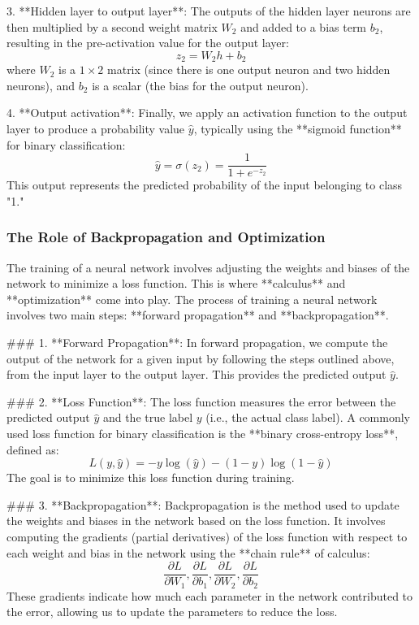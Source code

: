 \documentclass{article}
\begin{document}
3. **Hidden layer to output layer**: The outputs of the hidden layer neurons are then multiplied by a second weight matrix \( W_2 \) and added to a bias term \( b_2 \), resulting in the pre-activation value for the output layer:
   \[
   z_2 = W_2 h + b_2
   \]
   where \( W_2 \) is a \( 1 \times 2 \) matrix (since there is one output neuron and two hidden neurons), and \( b_2 \) is a scalar (the bias for the output neuron).

4. **Output activation**: Finally, we apply an activation function to the output layer to produce a probability value \( \hat{y} \), typically using the **sigmoid function** for binary classification:
   \[
   \hat{y} = \sigma(z_2) = \frac{1}{1 + e^{-z_2}}
   \]
   This output represents the predicted probability of the input belonging to class "1."

\subsubsection*{The Role of Backpropagation and Optimization}

The training of a neural network involves adjusting the weights and biases of the network to minimize a loss function. This is where **calculus** and **optimization** come into play. The process of training a neural network involves two main steps: **forward propagation** and **backpropagation**.

### 1. **Forward Propagation**:
   In forward propagation, we compute the output of the network for a given input by following the steps outlined above, from the input layer to the output layer. This provides the predicted output \( \hat{y} \).

### 2. **Loss Function**:
   The loss function measures the error between the predicted output \( \hat{y} \) and the true label \( y \) (i.e., the actual class label). A commonly used loss function for binary classification is the **binary cross-entropy loss**, defined as:
   \[
   L(y, \hat{y}) = -y \log(\hat{y}) - (1 - y) \log(1 - \hat{y})
   \]
   The goal is to minimize this loss function during training.

### 3. **Backpropagation**:
   Backpropagation is the method used to update the weights and biases in the network based on the loss function. It involves computing the gradients (partial derivatives) of the loss function with respect to each weight and bias in the network using the **chain rule** of calculus:
   \[
   \frac{\partial L}{\partial W_1}, \frac{\partial L}{\partial b_1}, \frac{\partial L}{\partial W_2}, \frac{\partial L}{\partial b_2}
   \]
   These gradients indicate how much each parameter in the network contributed to the error, allowing us to update the parameters to reduce the loss.
\end{document}
